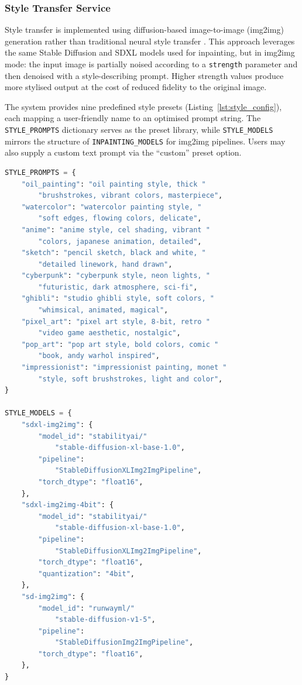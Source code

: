 \documentclass[12pt,a4paper]{report}
\begin{document}
\subsubsection{Style Transfer Service}
\label{sec:style_transfer_service}

Style transfer is implemented using diffusion-based image-to-image (img2img) generation rather than traditional neural style transfer \citep{gatys2016style}. This approach leverages the same Stable Diffusion and SDXL models used for inpainting, but in img2img mode: the input image is partially noised according to a \texttt{strength} parameter and then denoised with a style-describing prompt. Higher strength values produce more stylised output at the cost of reduced fidelity to the original image.

The system provides nine predefined style presets (Listing~\ref{lst:style_config}), each mapping a user-friendly name to an optimised prompt string. The \texttt{STYLE\_PROMPTS} dictionary serves as the preset library, while \texttt{STYLE\_MODELS} mirrors the structure of \texttt{INPAINTING\_MODELS} for img2img pipelines. Users may also supply a custom text prompt via the ``custom'' preset option.

\begin{lstlisting}[language=Python, caption={Style presets and model configuration (\texttt{diffusion.py})}, label={lst:style_config}]
STYLE_PROMPTS = {
    "oil_painting": "oil painting style, thick "
        "brushstrokes, vibrant colors, masterpiece",
    "watercolor": "watercolor painting style, "
        "soft edges, flowing colors, delicate",
    "anime": "anime style, cel shading, vibrant "
        "colors, japanese animation, detailed",
    "sketch": "pencil sketch, black and white, "
        "detailed linework, hand drawn",
    "cyberpunk": "cyberpunk style, neon lights, "
        "futuristic, dark atmosphere, sci-fi",
    "ghibli": "studio ghibli style, soft colors, "
        "whimsical, animated, magical",
    "pixel_art": "pixel art style, 8-bit, retro "
        "video game aesthetic, nostalgic",
    "pop_art": "pop art style, bold colors, comic "
        "book, andy warhol inspired",
    "impressionist": "impressionist painting, monet "
        "style, soft brushstrokes, light and color",
}

STYLE_MODELS = {
    "sdxl-img2img": {
        "model_id": "stabilityai/"
            "stable-diffusion-xl-base-1.0",
        "pipeline":
            "StableDiffusionXLImg2ImgPipeline",
        "torch_dtype": "float16",
    },
    "sdxl-img2img-4bit": {
        "model_id": "stabilityai/"
            "stable-diffusion-xl-base-1.0",
        "pipeline":
            "StableDiffusionXLImg2ImgPipeline",
        "torch_dtype": "float16",
        "quantization": "4bit",
    },
    "sd-img2img": {
        "model_id": "runwayml/"
            "stable-diffusion-v1-5",
        "pipeline":
            "StableDiffusionImg2ImgPipeline",
        "torch_dtype": "float16",
    },
}
\end{lstlisting}
\end{document}
